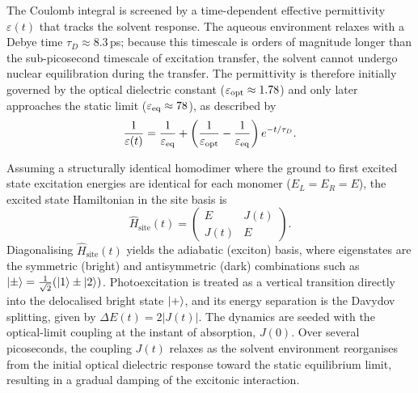 \documentclass[journal=jpcbfk, manuscript=article, layout=twocolumn, doi=true]{achemso}
\begin{document}
The Coulomb integral is screened by a time-dependent effective permittivity $\varepsilon(t)$ that tracks the solvent response. The aqueous environment relaxes with a Debye time $\tau_D \approx 8.3$\,ps; because this timescale is orders of magnitude longer than the sub-picosecond timescale of excitation transfer, the solvent cannot undergo nuclear equilibration during the transfer. The permittivity is therefore initially governed by the optical dielectric constant ($\varepsilon_{\rm opt} \approx 1.78$) and only later approaches the static limit ($\varepsilon_{\rm eq} \approx 78$), as described by
\begin{equation}
    \frac{1}{\varepsilon(t)} = \frac{1}{\varepsilon_{\rm eq}} + \left(\frac{1}{\varepsilon_{\rm opt}} - \frac{1}{\varepsilon_{\rm eq}}\right)e^{-t/\tau_D}.
\end{equation}

Assuming a structurally identical homodimer where the ground to first excited state excitation energies are identical for each monomer ($E_L = E_R = E$), the excited state Hamiltonian in the site basis is
\begin{equation}
    \hat H_{\text{site}}(t)=\begin{pmatrix} E & J(t) \\ J(t) & E \end{pmatrix}.
\end{equation}
Diagonalising $\hat H_{\text{site}}(t)$ yields the adiabatic (exciton) basis, where eigenstates are the symmetric (bright) and antisymmetric (dark) combinations such as $\ket{\pm} = \frac{1}{\sqrt{2}}(\ket{1} \pm \ket{2})$. Photoexcitation is treated as a vertical transition directly into the delocalised bright state $\ket{+}$, and its energy separation is the Davydov splitting, given by $\Delta E(t) = 2|J(t)|$. The dynamics are seeded with the optical-limit coupling at the instant of absorption, $J(0)$. Over several picoseconds, the coupling $J(t)$ relaxes as the solvent environment reorganises from the initial optical dielectric response toward the static equilibrium limit, resulting in a gradual damping of the excitonic interaction.
\end{document}
